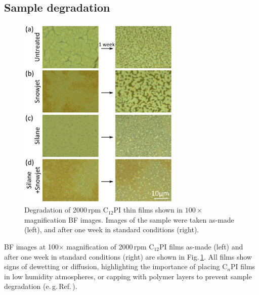 \subsection{Sample degradation}
\begin{figure}[h!]
\centering
\includegraphics[width=0.7\textwidth]{Fig4}
\caption{Degradation of 2000\,rpm C$_{12}$PI thin films shown in $100\times$ magnification BF images. Images of the sample were taken as-made (left), and after one week in standard conditions (right).}
\label{4Fig4}
\end{figure}
BF images at 100$\times$ magnification of 2000\,rpm C$_{12}$PI films as-made (left) and after one week in standard conditions (right) are shown in Fig.\,\ref{4Fig4}. All films show signs of dewetting or diffusion, highlighting the importance of placing C$_n$PI films in low humidity atmospheres, or capping with polymer layers to prevent sample degradation (e.\,g.\,Ref.\,\cite{Pradeesh2009}).

